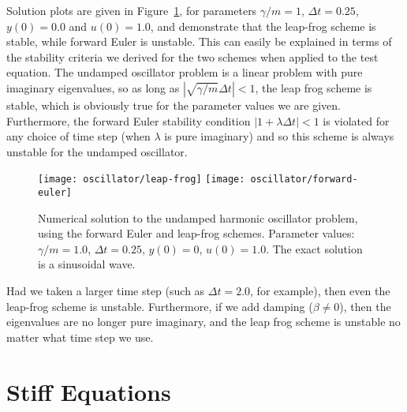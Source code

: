 \begin{example}
  Solution plots are given in
  Figure~\ref{lab2:fig:test-leap-frog}, for parameters $\gamma/m=1$,
  $\Delta t=0.25$, $y(0)=0.0$ and $u(0)=1.0$, and demonstrate that the
  leap-frog scheme is stable, while forward Euler is unstable.
  This can easily be explained in terms of the stability criteria we
  derived for the two schemes when applied to the test equation.
  The undamped oscillator problem is a linear problem with pure
  imaginary eigenvalues, so as long as $|\sqrt{\gamma/m}\Delta t|<1$,
  the leap frog scheme is stable, which is obviously true for the
  parameter values we are given.  
  Furthermore, the forward Euler stability condition $|1+\lambda\Delta
  t|<1$ is violated for any choice of time step (when $\lambda$ is
  pure imaginary) and so this scheme is always unstable for the
  undamped oscillator.
  \begin{figure}[htbp]
    \begin{center}
      \leavevmode
      \texttt{[image: oscillator/leap-frog]}
      \texttt{[image: oscillator/forward-euler]}
      \caption{Numerical solution to the undamped harmonic oscillator
        problem, using the forward Euler and leap-frog schemes.
        Parameter values: $\gamma/m=1.0$, $\Delta t=0.25$, $y(0)=0$,
        $u(0)=1.0$.  The exact solution is a sinusoidal wave.}
      \label{lab2:fig:test-leap-frog}
    \end{center}
  \end{figure}

  \begin{note}
    Had we taken a larger time step (such as $\Delta t=2.0$, for
    example), then even the leap-frog scheme is unstable.
    Furthermore, if we add damping 
    ($\beta\neq 0$), then the eigenvalues are no longer pure imaginary,
    and the leap frog scheme is unstable no matter what time step we
    use.   
  \end{note}
\end{example}

\section{Stiff Equations}
\label{lab2:sec:stiffness}

